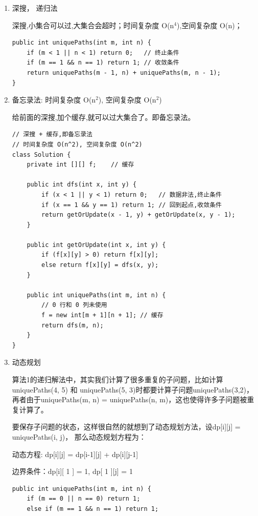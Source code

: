 \documentclass[12pt]{book}
\begin{document}
\begin{enumerate}
\item 深搜， 递归法
\label{sec-14-2-1-1}

深搜,小集合可以过,大集合会超时；时间复杂度 O(n$^{\text{4}}$),空间复杂度 O(n)；
\lstset{language=java,label= ,caption= ,numbers=none}
\begin{lstlisting}
public int uniquePaths(int m, int n) {
    if (m < 1 || n < 1) return 0;   // 终止条件
    if (m == 1 && n == 1) return 1; // 收敛条件
    return uniquePaths(m - 1, n) + uniquePaths(m, n - 1);
}
\end{lstlisting}
\item 备忘录法: 时间复杂度 O(n$^{\text{2}}$), 空间复杂度 O(n$^{\text{2}}$)
\label{sec-14-2-1-2}

给前面的深搜,加个缓存,就可以过大集合了。即备忘录法。
\lstset{language=java,label= ,caption= ,numbers=none}
\begin{lstlisting}
// 深搜 + 缓存,即备忘录法
// 时间复杂度 O(n^2), 空间复杂度 O(n^2)
class Solution {
    private int [][] f;    // 缓存

    public int dfs(int x, int y) {
        if (x < 1 || y < 1) return 0;   // 数据非法,终止条件
        if (x == 1 && y == 1) return 1; // 回到起点,收敛条件
        return getOrUpdate(x - 1, y) + getOrUpdate(x, y - 1);
    }

    public int getOrUpdate(int x, int y) {
        if (f[x][y] > 0) return f[x][y];
        else return f[x][y] = dfs(x, y);
    }

    public int uniquePaths(int m, int n) {        
        // 0 行和 0 列未使用
        f = new int[m + 1][n + 1]; // 缓存
        return dfs(m, n);
    }
}
\end{lstlisting}
\item 动态规划
\label{sec-14-2-1-3}

算法1的递归解法中，其实我们计算了很多重复的子问题，比如计算uniquePaths(4, 5) 和 uniquePaths(5, 3)时都要计算子问题uniquePaths(3,2)，再者由于uniquePaths(m, n) = uniquePaths(n, m)，这也使得许多子问题被重复计算了。

要保存子问题的状态，这样很自然的就想到了动态规划方法，设dp[i][j] = uniquePaths(i, j)， 那么动态规划方程为：

动态方程: dp[i][j] = dp[i-1][j] + dp[i][j-1]

边界条件：dp[i][ 1 ] = 1, dp[ 1 ][j] = 1
\lstset{language=java,label= ,caption= ,numbers=none}
\begin{lstlisting}
public int uniquePaths(int m, int n) {
    if (m == 0 || n == 0) return 1;
    else if (m == 1 && n == 1) return 1;


\end{lstlisting}
\end{enumerate}
\end{document}
